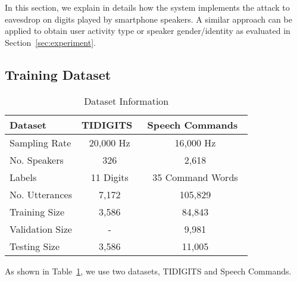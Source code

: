 In this section, we explain in details how the {\systemName} system implements the {\attackName} attack to eavesdrop on digits played by smartphone speakers. A similar approach can be applied to obtain user activity type or speaker gender/identity as evaluated in Section~\ref{sec:experiment}.


\subsection{Training Dataset}

\begin{table}[h]
	\caption{Dataset Information}
	\label{tab:dataset}
	\centering
	\begin{tabular}{lcc} %
		\toprule		
		Dataset & TIDIGITS~\cite{leonard1993tidigits} & Speech Commands~\cite{warden2018speech}\\
		\midrule
		Sampling Rate & 20,000 Hz & 16,000 Hz\\
		No. Speakers & 326 & 2,618\\
		Labels & 11 Digits & 35 Command Words \\
		No. Utterances & 7,172& 105,829\\
		Training Size & 3,586 & 84,843\\
		Validation Size & - & 9,981\\
		Testing Size & 3,586 & 11,005\\
		\bottomrule
	\end{tabular}
\end{table}

As shown in Table~\ref{tab:dataset}, we use two datasets, TIDIGITS and Speech Commands. 

